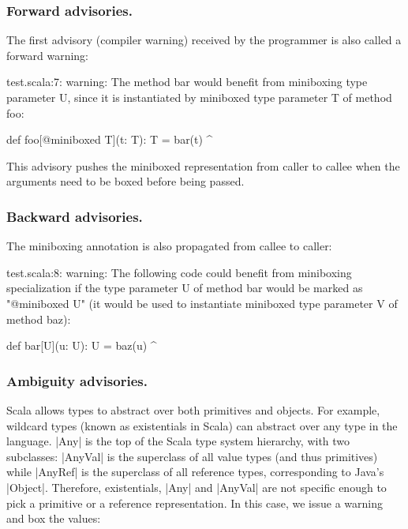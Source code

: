 \subsubsection*{Forward advisories.} The first advisory (compiler warning) received by the programmer is also called a forward warning:

\begin{lstlisting-nobreak-nolang}
test.scala:7: warning: The method bar would benefit from miniboxing type parameter U, since it is instantiated by miniboxed type parameter T of method foo:

       def foo[@miniboxed T](t: T): T = bar(t)
                                                   ^
\end{lstlisting-nobreak-nolang}

This advisory pushes the miniboxed representation from caller to callee when the arguments need to be boxed before being passed.

\subsubsection*{Backward advisories.} The miniboxing annotation is also propagated from callee to caller:

\begin{lstlisting-nobreak-nolang}
test.scala:8: warning: The following code could benefit from miniboxing specialization if the type parameter U of method bar would be marked as "@miniboxed U" (it would be used to instantiate miniboxed type parameter V of method baz):

        def bar[U](u: U): U = baz(u)
                                     ^
\end{lstlisting-nobreak-nolang}

\subsubsection*{Ambiguity advisories.} Scala allows types to abstract over both primitives and objects. For example, wildcard types (known as existentials in Scala) can abstract over any type in the language. |Any| is the top of the Scala type system hierarchy, with two subclasses: |AnyVal| is the superclass of all value types (and thus primitives) while |AnyRef| is the superclass of all reference types, corresponding to Java's |Object|. Therefore, existentials, |Any| and |AnyVal| are not specific enough to pick a primitive or a reference representation. In this case, we issue a warning and box the values:


